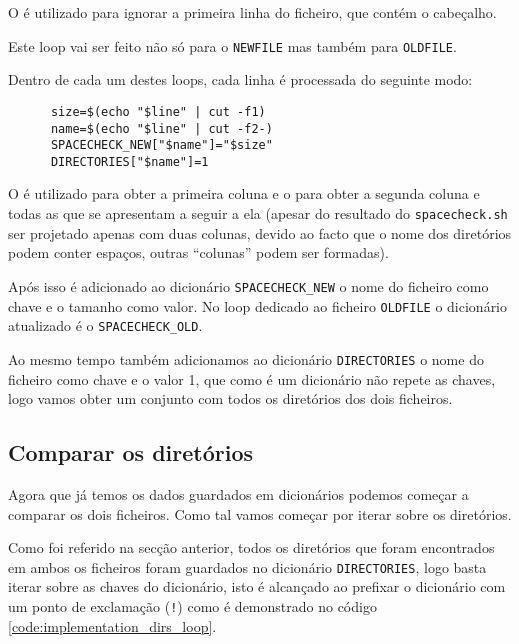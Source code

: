 O  é utilizado para ignorar a primeira linha do ficheiro,
que contém o cabeçalho.

Este loop vai ser feito não só para o \Verb|NEWFILE| mas também para
\Verb|OLDFILE|.

Dentro de cada um destes loops, cada linha é processada do seguinte modo:

\begin{listing}[H]
	\centering
	\begin{verbatim}
      size=$(echo "$line" | cut -f1)
      name=$(echo "$line" | cut -f2-)
      SPACECHECK_NEW["$name"]="$size"
      DIRECTORIES["$name"]=1
  \end{verbatim}
	\cprotect\caption{Processamento de uma linha do resultado do \Verb|spacecheck.sh|}
\end{listing}

O  é utilizado para obter a primeira coluna e o
 para obter a segunda coluna e todas as que se apresentam a
seguir a ela (apesar do resultado do \Verb|spacecheck.sh| ser projetado apenas
com duas colunas, devido ao facto que o nome dos diretórios podem conter
espaços, outras \enquote{colunas} podem ser formadas).

Após isso é adicionado ao dicionário \Verb|SPACECHECK_NEW| o nome do ficheiro
como chave e o tamanho como valor. No loop dedicado ao ficheiro
\Verb|OLDFILE| o dicionário atualizado é o \Verb|SPACECHECK_OLD|.

Ao mesmo tempo também adicionamos ao dicionário \Verb|DIRECTORIES| o nome do
ficheiro como chave e o valor 1, que como é um dicionário não repete as chaves,
logo vamos obter um conjunto com todos os diretórios dos dois ficheiros.

\subsection{Comparar os diretórios}

Agora que já temos os dados guardados em dicionários podemos começar a comparar
os dois ficheiros. Como tal vamos começar por iterar sobre os diretórios.

Como foi referido na secção anterior, todos os diretórios que foram encontrados
em ambos os ficheiros foram guardados no dicionário \Verb|DIRECTORIES|, logo
basta iterar sobre as chaves do dicionário, isto é alcançado ao prefixar o
dicionário com um ponto de exclamação (\Verb|!|) como é demonstrado no código
\ref{code:implementation_dirs_loop}.

